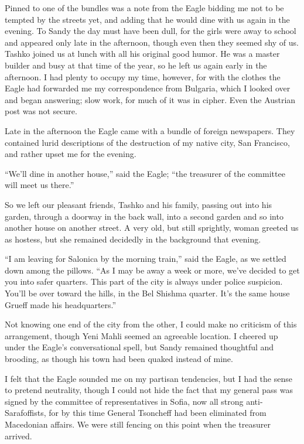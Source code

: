 \documentclass[a5paper,12pt]{book}
\begin{document}
Pinned to one of the bundles was a note from the Eagle bidding me not to be tempted by the streets yet, and adding that he would dine with us again in the evening. To Sandy the day must have been dull, for the girls were away to school and appeared only late in the afternoon, though even then they seemed shy of us. Tashko joined us at lunch with all his original good humor. He was a master builder and busy at that time of the year, so he left us again early in the afternoon. I had plenty to occupy my time, however, for with the clothes the Eagle had forwarded me my correspondence from Bulgaria, which I looked over and began answering; slow work, for much of it was in cipher. Even the Austrian post was not secure. 

Late in the afternoon the Eagle came with a bundle of foreign newspapers. They contained lurid descriptions of the destruction of my native city, San Francisco, and rather upset me for the evening. 

“We’ll dine in another house,” said the Eagle; “the treasurer of the committee will meet us there.” 

So we left our pleasant friends, Tashko and his family, passing out into his garden, through a doorway in the back wall, into a second garden and so into another house on another street. A very old, but still sprightly, woman greeted us as hostess, but she remained decidedly in the background that evening. 

“I am leaving for Salonica by the morning train,” said the Eagle, as we settled down among the pillows. “As I may be away a week or more, we’ve decided to get you into safer quarters. This part of the city is always under police suspicion. You’ll be over toward the hills, in the Bel Shishma quarter. It’s the same house Grueff made his headquarters.” 

Not knowing one end of the city from the other, I could make no criticism of this arrangement, though Yeni Mahli seemed an agreeable location. I cheered up under the Eagle’s conversational spell, but Sandy remained thoughtful and brooding, as though his town had been quaked instead of mine. 

I felt that the Eagle sounded me on my partisan tendencies, but I had the sense to pretend neutrality, though I could not hide the fact that my general pass was signed by the committee of representatives in Sofia, now all strong anti-Sarafoffists, for by this time General Tsoncheff had been eliminated from Macedonian affairs. We were still fencing on this point when the treasurer arrived. 
\end{document}

